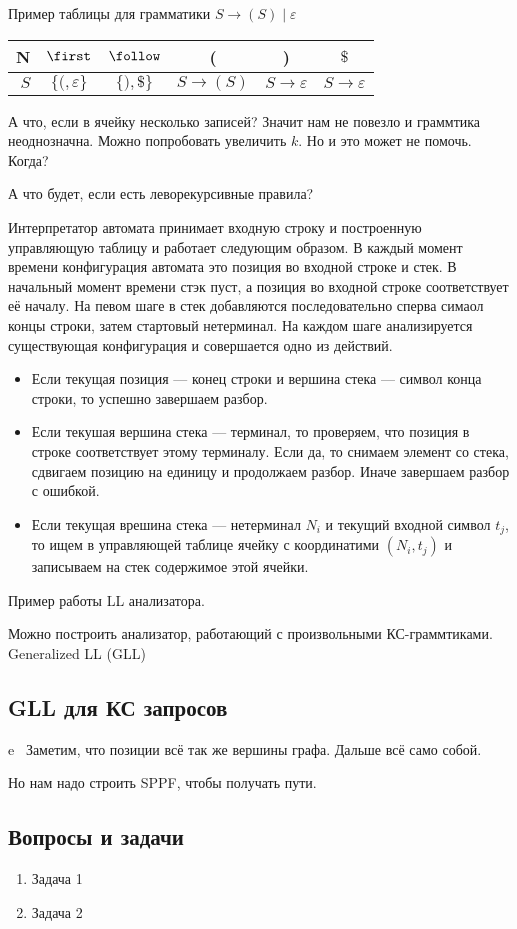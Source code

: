 \begin{example}

Пример таблицы для грамматики $S \to ( S ) \mid \varepsilon$

\begin{center}
\begin{tabular}{ r || c | c || c | c | c }
N & $\first$ & $\follow$ & ( & ) & $\$ $ \\ \hline  
$S$ & $\{ (, \varepsilon \}$ & $\{ ), \$ \}$ & $S \rightarrow (S)$ & $S \rightarrow \varepsilon$ & $S \rightarrow \varepsilon$ 
\end{tabular}  
\end{center}

\end{example}

А что, если в ячейку несколько записей? Значит нам не повезло и граммтика неоднозначна. Можно попробовать увеличить $k$. Но и это может не помочь. Когда?

А что будет, если есть леворекурсивные правила?

Интерпретатор автомата принимает входную строку и построенную управляющую таблицу и работает следующим образом. 
В каждый момент времени конфигурация автомата это позиция во входной строке и стек. 
В начальный момент времени стэк пуст, а позиция во входной строке соответствует её началу.
На певом шаге в стек добавляются последовательно сперва симаол концы строки, затем стартовый нетерминал.
На каждом шаге анализируется существующая конфигурация и совершается одно из действий.
\begin{itemize}
\item Если текущая позиция --- конец строки и вершина стека --- символ конца строки, то успешно завершаем разбор.
\item Если текушая вершина стека --- терминал, то проверяем, что позиция в строке соответствует этому терминалу. Если да, то снимаем элемент со стека, сдвигаем позицию на единицу и продолжаем разбор. Иначе завершаем разбор с ошибкой.
\item Если текущая врешина стека --- нетерминал $N_i$ и текущий входной символ $t_j$, то ищем в управляющей таблице ячейку с координатими $(N_i, t_j)$ и записываем на стек содержимое этой ячейки.
\end{itemize}

\begin{example}Пример работы LL анализатора.
\end{example}


Можно построить анализатор, работающий с произвольными КС-граммтиками.
Generalized LL (GLL)~\cite{Scott:2010:GP:1860132.1860320,10.1007/978-3-662-46663-6_5}


\subsection{GLL для КС запросов}
e~\cite{Grigorev:2017:CPQ:3166094.3166104}
Заметим, что позиции всё так же вершины графа.
Дальше всё само собой.

Но нам надо строить SPPF, чтобы получать пути.


\subsection{Вопросы и задачи}
\begin{enumerate}
  \item Задача 1
  \item Задача 2
\end{enumerate}

